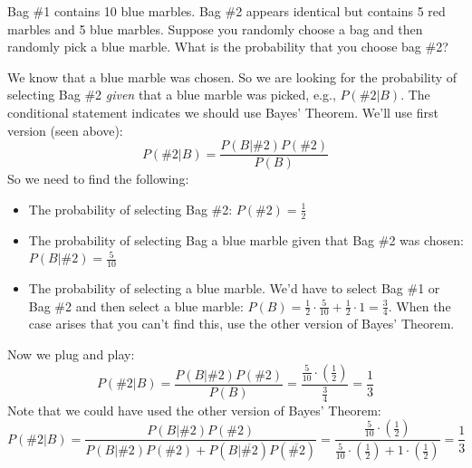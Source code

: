 \documentclass{exam}
\begin{document}
\begin{questions}
\question Bag \#1 contains 10 blue marbles. Bag \#2 appears identical but contains 5 red marbles and 5 blue marbles. Suppose you randomly choose a bag and then randomly pick a blue marble. What is the probability that you choose bag \#2?
    \begin{solution}
        We know that a blue marble was chosen. So we are looking for the probability of selecting Bag \#2 \emph{given} that a blue marble was picked, e.g., $P(\#2|B)$. The conditional statement indicates we should use Bayes' Theorem. We'll use first version (seen above):
            $$P(\#2|B)=\frac{P(B|\#2)P(\#2)}{P(B)}$$
        So we need to find the following:
        \begin{itemize}
            \item The probability of selecting Bag \#2: $P(\#2)=\frac{1}{2}$
            \item The probability of selecting Bag a blue marble given that Bag \#2 was chosen:$P(B|\#2)=\frac{5}{10}$
            \item The probability of selecting a blue marble. We'd have to select Bag \#1 or Bag \#2 and then select a blue marble: $P(B)=\frac{1}{2}\cdot \frac{5}{10}+\frac{1}{2}\cdot 1=\frac{3}{4}$. When the case arises that you can't find this, use the other version of Bayes' Theorem.
        \end{itemize}
        Now we plug and play: $$P(\#2|B)=\frac{P(B|\#2)P(\#2)}{P(B)}=\frac{\frac{5}{10} \cdot (\frac{1}{2})}{\frac{3}{4}}=\frac{1}{3}$$
        Note that we could have used the other version of Bayes' Theorem:
        \[ P(\#2|B)=\frac{P(B|\#2)P(\#2)}{P(B|\#2)P(\#2)+P(B|\overline{\#2})P(\overline{\#2})}=\frac{\frac{5}{10} \cdot (\frac{1}{2})}{\frac{5}{10} \cdot (\frac{1}{2})+1 \cdot (\frac{1}{2})}=\frac{1}{3} \]
    \end{solution}


\end{questions}
\end{document}

